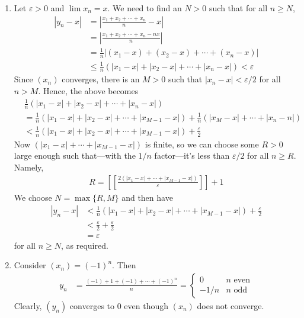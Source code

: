 \documentclass[a4paper]{report}
\newenvironment{ex}[1]
    {\noindent{\large \bf Exercise #1.}}{\vspace{0.5cm}}
\begin{document}
\begin{ex}{2.3.11}
  \begin{enumerate}[label=\alph*)]
  \item Let $\varepsilon > 0$ and $\lim x_n = x$. We need to find an $N > 0$
    such that for all $n \geq N$,
    \begin{align*}
      |y_n  - x| &= \left| \frac{x_1 + x_2 + \cdots + x_n}{n} - x\right| \\
                 &= \left| \frac{x_1 + x_2 + \cdots + x_n - nx}{n}\right| \\
                 &= \frac{1}{n}\left| (x_1 - x) + (x_2 - x) + \cdots + (x_n - x)\right| \\
                 &\leq \frac{1}{n}\left(|x_1 - x| + |x_2 - x| + \cdots + |x_n - x|\right)  < \varepsilon
    \end{align*}
    Since $(x_n)$ converges, there is an $M > 0$ such that $|x_n - x| <
    \varepsilon/2$ for all $n > M$. Hence, the above becomes
    \begin{align*}
      &\frac{1}{n}\left(|x_1 - x| + |x_2 - x| + \cdots + |x_n - x|\right)  \\
      &= \frac{1}{n}\left( |x_1 - x| + |x_2 - x| + \cdots + |x_{M-1} - x| \right) + \frac{1}{n}\left( |x_{M} - x| + \cdots + |x_n -n | \right)\\
      &< \frac{1}{n}\left( |x_1 - x| + |x_2 - x| + \cdots + |x_{M-1} - x| \right) + \frac{\varepsilon}{2}
    \end{align*}
    Now $(|x_1 -x| + \cdots + |x_{M-1} -x|)$ is finite, so we can choose some $R
    > 0$ large enough such that---with the $1/n$ factor---it's less than $\varepsilon/2$ for all $n \geq
    R$. Namely, 
    \begin{align*}
R = \left[\left[\frac{2(|x_1 -x| + \cdots + |x_{M-1} -x|)}{\varepsilon}\right]\right] + 1
    \end{align*}
We choose $N = \max\{R, M\}$ and then have 
\begin{align*}
|y_n  - x|  &< \frac{1}{n}\left( |x_1 - x| + |x_2 - x| + \cdots + |x_{M-1} - x| \right) + \frac{\varepsilon}{2} \\
            &< \frac{\varepsilon}{2} + \frac{\varepsilon}{2} \\
            &= \varepsilon
\end{align*}
for all $n \geq N$, as required.
\item Consider $(x_n) = (-1)^n$. Then
  \begin{align*}
    y_n &= \frac{(-1) + 1 + (-1) + \cdots + (-1)^n}{n}  = \begin{cases}
      0 & \text{$n$ even} \\
      -1/n & \text{$n$ odd}
       \end{cases}
  \end{align*}
Clearly, $(y_n)$ converges to 0 even though $(x_n)$ does not converge.
  \end{enumerate}
\end{ex}
\end{document}
